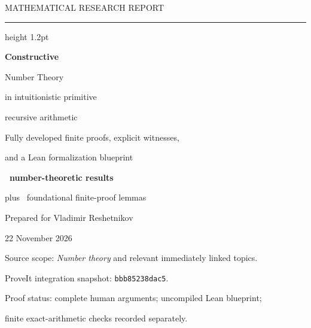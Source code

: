\documentclass[11pt,letterpaper]{article}
\theoremstyle{definition}
\theoremstyle{remark}
\begin{document}
\hypersetup{pageanchor=false}
\begin{titlepage}
\color{ink}
\vspace*{0.8cm}
{\large MATHEMATICAL RESEARCH REPORT\par}
\vspace{0.35cm}
\hrule height 1.2pt
\vspace{1.1cm}
{\Huge\bfseries Constructive\par Number Theory\par}
\vspace{0.3cm}
{\LARGE in intuitionistic primitive\par recursive arithmetic\par}
\vspace{0.9cm}
{\large Fully developed finite proofs, explicit witnesses,\par
and a Lean formalization blueprint\par}
\vspace{1.2cm}
{\Large\bfseries \NumberTheoryCount\ number-theoretic results\par}
\vspace{0.15cm}
{\large plus \FoundationCount\ foundational finite-proof lemmas\par}
\vfill
{\large Prepared for Vladimir Reshetnikov\par}
\vspace{0.35cm}
{\large 22 November 2026\par}
\vspace{0.6cm}
{\small Source scope: \emph{Number theory} and relevant immediately linked topics.\par
ProveIt integration snapshot: \texttt{bbb85238dac5}.\par
Proof status: complete human arguments; uncompiled Lean blueprint;\par
finite exact-arithmetic checks recorded separately.\par}
\end{titlepage}
\hypersetup{pageanchor=true}
\tableofcontents
\clearpage

\clearpage

\clearpage

\clearpage

\clearpage

\clearpage

\clearpage

\clearpage

\clearpage

\clearpage
\appendix
\end{document}
